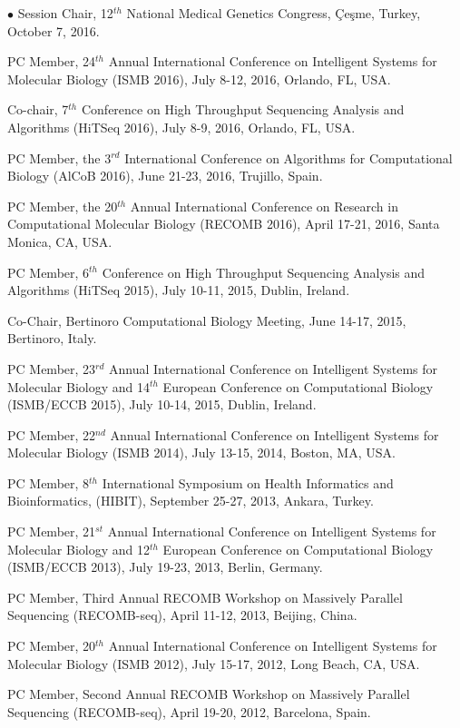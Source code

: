 \documentclass[margin,line]{res}
\newenvironment{list2}{
  \begin{list}{$\bullet$}{%
      \setlength{\itemsep}{0in}
      \setlength{\parsep}{0in} \setlength{\parskip}{0in}
      \setlength{\topsep}{0in} \setlength{\partopsep}{0in} 
      \setlength{\leftmargin}{0.2in}}}{\end{list}}
\begin{document}
\begin{resume}
\begin{list2}
  Session Chair, 12$^{th}$ National Medical Genetics Congress, Çeşme, Turkey, October 7, 2016.
\item
  PC Member, 24$^{th}$ Annual International Conference on Intelligent Systems for Molecular Biology  (ISMB 2016), July 8-12, 2016, Orlando, FL, USA.
\item
  Co-chair, 7$^{th}$ Conference on High Throughput Sequencing Analysis and Algorithms (HiTSeq 2016), July 8-9, 2016, Orlando, FL, USA.
\item
  PC Member, the 3$^{rd}$ International Conference on Algorithms for Computational Biology (AlCoB 2016),
  June 21-23, 2016, Trujillo, Spain.
\item
  PC Member, the 20$^{th}$ Annual International Conference on Research in Computational Molecular Biology
  (RECOMB 2016), April 17-21, 2016, Santa Monica, CA, USA.
\item
  PC Member, 6$^{th}$ Conference on High Throughput Sequencing Analysis and Algorithms (HiTSeq 2015), July 10-11, 2015, Dublin, Ireland.
\item
  Co-Chair, Bertinoro Computational Biology Meeting, June 14-17, 2015, Bertinoro, Italy.
\item
  PC Member, 23$^{rd}$ Annual International Conference on Intelligent Systems for Molecular Biology and 14$^{th}$ European Conference on 
  Computational Biology  (ISMB/ECCB 2015), 
  July 10-14, 2015, Dublin, Ireland.
\item
  PC Member, 22$^{nd}$ Annual International Conference on Intelligent Systems for Molecular Biology 
  (ISMB 2014), 
  July 13-15, 2014, Boston, MA, USA.
\item
  PC Member, 8$^{th}$  International Symposium on Health Informatics and Bioinformatics, (HIBIT),
  September 25-27, 2013, Ankara, Turkey.
\item
  PC Member, 21$^{st}$ Annual International Conference on Intelligent Systems for Molecular Biology and 12$^{th}$ European Conference on 
  Computational Biology  (ISMB/ECCB 2013), 
  July 19-23, 2013, Berlin, Germany.
\item
  PC Member, Third Annual RECOMB Workshop on Massively Parallel Sequencing (RECOMB-seq), April 11-12, 2013, Beijing, China.
\item
  PC Member, 20$^{th}$ Annual International Conference on Intelligent Systems for Molecular Biology
  (ISMB 2012), July 15-17, 2012, Long Beach, CA, USA. 
\item
  PC Member, Second Annual RECOMB Workshop on Massively Parallel Sequencing (RECOMB-seq), April 19-20, 2012, Barcelona, Spain.

\end{list2}
\end{resume}
\end{document}
